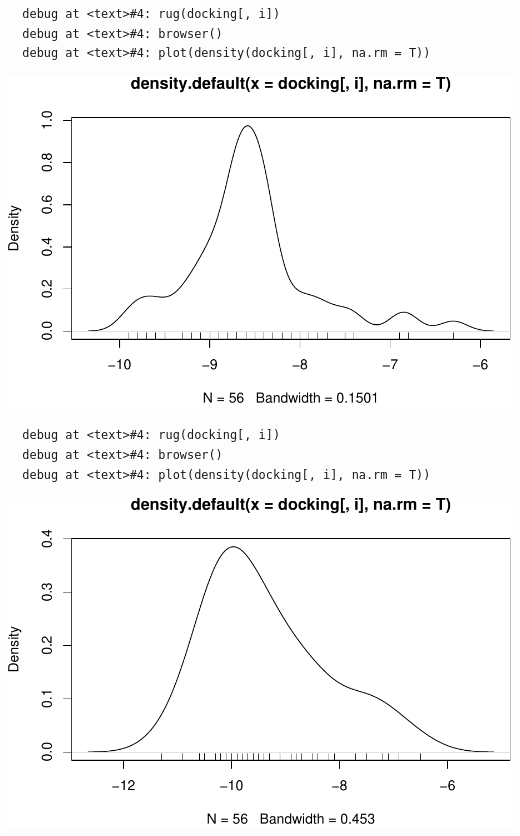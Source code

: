 \documentclass[12pt,twoside]{reedthesis}
\begin{document}
  \begin{verbatim}
  debug at <text>#4: rug(docking[, i])
  debug at <text>#4: browser()
  debug at <text>#4: plot(density(docking[, i], na.rm = T))
  \end{verbatim}
  
  \begin{center}\includegraphics{tesis_files/figure-latex/johan-14} \end{center}
  
  \begin{verbatim}
  debug at <text>#4: rug(docking[, i])
  debug at <text>#4: browser()
  debug at <text>#4: plot(density(docking[, i], na.rm = T))
  \end{verbatim}
  
  \begin{center}\includegraphics{tesis_files/figure-latex/johan-15} \end{center}
  
\end{document}
